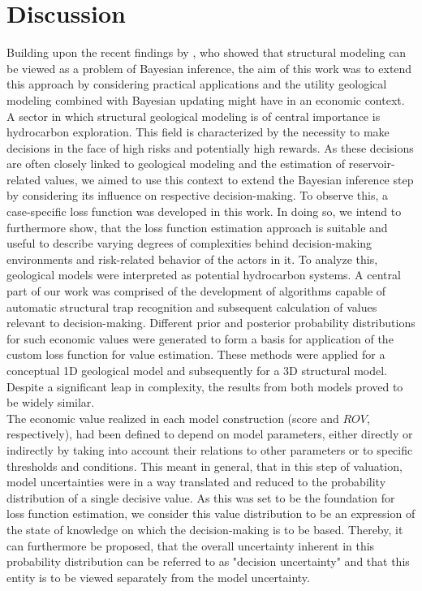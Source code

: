 	\chapter{Discussion}\label{cha:discussion}
	Building upon the recent findings by \citet{delaVarga2016}, who showed that structural modeling can be viewed as a problem of Bayesian inference, the aim of this work was to extend this approach by considering practical applications and the utility geological modeling combined with Bayesian updating might have in an economic context. A sector in which structural geological modeling is of central importance is hydrocarbon exploration. This field is characterized by the necessity to make decisions in the face of high risks and potentially high rewards. As these decisions are often closely linked to geological modeling and the estimation of reservoir-related values, we aimed to use this context to extend the Bayesian inference step by considering its influence on respective decision-making. To observe this, a case-specific loss function was developed in this work. In doing so, we intend to furthermore show, that the loss function estimation approach is suitable and useful to describe varying degrees of complexities behind decision-making environments and risk-related behavior of the actors in it.
	To analyze this, geological models were interpreted as potential hydrocarbon systems. A central part of our work was comprised of the development of algorithms capable of automatic structural trap recognition and subsequent calculation of values relevant to decision-making. Different prior and posterior probability distributions for such economic values were generated to form a basis for application of the custom loss function for value estimation. These methods were applied for a conceptual 1D geological model and subsequently for a 3D structural model. 
	Despite a significant leap in complexity, the results from both models proved to be widely similar.\\
	
	The economic value realized in each model construction (score and $ROV$, respectively), had been defined to depend on model parameters, either directly or indirectly by taking into account their relations to other parameters or to specific thresholds and conditions. This meant in general, that in this step of valuation, model uncertainties were in a way translated and reduced to the probability distribution of a single decisive value. As this was set to be the foundation for loss function estimation, we consider this value distribution to be an expression of the state of knowledge on which the decision-making is to be based. Thereby, it can furthermore be proposed, that the overall uncertainty inherent in this probability distribution can be referred to as "decision uncertainty" and that this entity is to be viewed separately from the model uncertainty.\\
	

